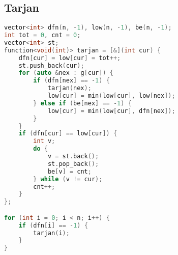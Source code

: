 \subsection{Tarjan}
\begin{lstlisting}[language=c++]
vector<int> dfn(n, -1), low(n, -1), be(n, -1);
int tot = 0, cnt = 0;
vector<int> st;
function<void(int)> tarjan = [&](int cur) {
    dfn[cur] = low[cur] = tot++;
    st.push_back(cur);
    for (auto &nex : g[cur]) {
        if (dfn[nex] == -1) {
            tarjan(nex);
            low[cur] = min(low[cur], low[nex]);
        } else if (be[nex] == -1) {
            low[cur] = min(low[cur], dfn[nex]);
        }
    }
    if (dfn[cur] == low[cur]) {
        int v;
        do {
            v = st.back();
            st.pop_back();
            be[v] = cnt;
        } while (v != cur);
        cnt++;
    }
};

for (int i = 0; i < n; i++) {
    if (dfn[i] == -1) {
        tarjan(i);
    }
}   
\end{lstlisting}